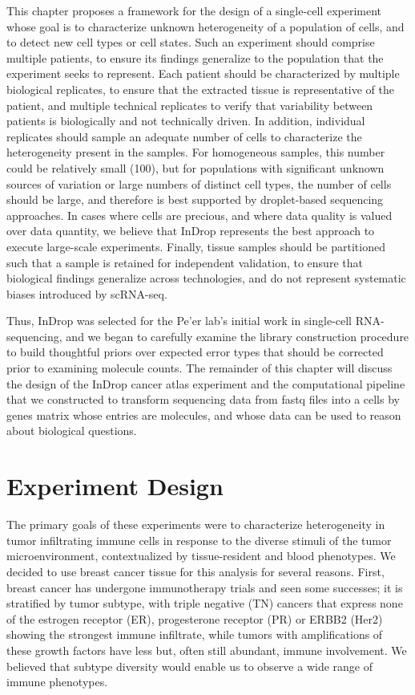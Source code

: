 This chapter proposes a framework for the design of a single-cell experiment whose goal is to characterize unknown heterogeneity of a population of cells, and to detect new cell types or cell states. 
Such an experiment should comprise multiple patients, to ensure its findings generalize to the population that the experiment seeks to represent. 
Each patient should be characterized by multiple biological replicates, to ensure that the extracted tissue is representative of the patient, and multiple technical replicates to verify that variability between patients is biologically and not technically driven. 
In addition, individual replicates should sample an adequate number of cells to characterize the heterogeneity present in the samples. 
For homogeneous samples, this number could be relatively small (100), but for populations with significant unknown sources of variation or large numbers of distinct cell types, the number of cells should be large, and therefore is best supported by droplet-based sequencing approaches.
In cases where cells are precious, and where data quality is valued over data quantity, we believe that InDrop represents the best approach to execute large-scale experiments. 
Finally, tissue samples should be partitioned such that a sample is retained for independent validation, to ensure that biological findings generalize across technologies, and do not represent systematic biases introduced by scRNA-seq. 

Thus, InDrop was selected for the Pe’er lab’s initial work in single-cell RNA-sequencing, and we began to carefully examine the library construction procedure to build thoughtful priors over expected error types that should be corrected prior to examining molecule counts. 
The remainder of this chapter will discuss the design of the InDrop cancer atlas experiment and the computational pipeline that we constructed to transform sequencing data from fastq files into a cells by genes matrix whose entries are molecules, and whose data can be used to reason about biological questions. 

\section{Experiment Design}

The primary goals of these experiments were to characterize heterogeneity in tumor infiltrating immune cells in response to the diverse stimuli of the tumor microenvironment, contextualized by tissue-resident and blood phenotypes. 
We decided to use breast cancer tissue for this analysis for several reasons.
First, breast cancer has undergone immunotherapy trials and seen some successes; it is stratified by tumor subtype, with triple negative (TN) cancers that express none of the estrogen receptor (ER), progesterone receptor (PR) or ERBB2 (Her2) showing the strongest immune infiltrate, while tumors with amplifications of these growth factors have less but, often still abundant, immune involvement.
We believed that subtype diversity would enable us to observe a wide range of immune phenotypes. 

